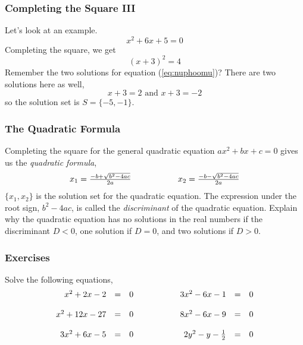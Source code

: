 \documentclass[xcolor=dvipsnames]{beamer}
\begin{document}
\begin{frame}
  \frametitle{Completing the Square III}
Let's look at an example.
\begin{equation}
  \label{eq:chohceih}
  x^{2}+6x+5=0
\end{equation}
Completing the square, we get
\begin{equation}
  \label{eq:raibohph}
  (x+3)^{2}=4
\end{equation}
Remember the two solutions for equation (\ref{eq:nuphoomu})?
There are two solutions here as well,
\begin{equation}
  \label{eq:efehisuu}
  x+3=2\mbox{ and }x+3=-2
\end{equation}
so the solution set is $S=\{-5,-1\}$.
\end{frame}

\begin{frame}
  \frametitle{The Quadratic Formula}
Completing the square for the general quadratic equation
$ax^{2}+bx+c=0$ gives us the \emph{quadratic formula},
\begin{equation}
  \label{eq:iedohkei}
\begin{array}{lcl}
x_{1}=\frac{-b+\sqrt{b^{2}-4ac}}{2a} & \hspace{.5in} & x_{2}=\frac{-b-\sqrt{b^{2}-4ac}}{2a}
\end{array}
\end{equation}
$\{x_{1},x_{2}\}$ is the solution set for the quadratic equation. The
expression under the root sign, $b^{2}-4ac$, is called the
\emph{discriminant} of the quadratic equation. Explain why the
quadratic equation has no solutions in the real numbers if the
discriminant $D<0$, one solution if $D=0$, and two solutions if $D>0$.
\end{frame}

\begin{frame}
  \frametitle{Exercises}
{\ubung} Solve the following equations,
\begin{equation}
  \label{eq:humourah}
  \begin{array}{rclcrcl}
    x^{2}+2x-2&=&0&\hspace{.5in}&3x^{2}-6x-1&=&0 \\
\hspace{.5in} && \\
    x^{2}+12x-27&=&0&\hspace{.5in}&8x^{2}-6x-9&=&0 \\
\hspace{.5in} && \\
    3x^{2}+6x-5&=&0&\hspace{.5in}&2y^{2}-y-\frac{1}{2}&=&0 \\
  \end{array}
\end{equation}
\end{frame}
\end{document}
